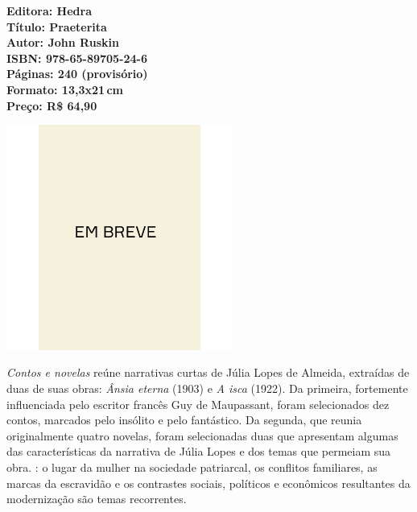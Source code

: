 \vfill
\noindent\begin{minipage}[c]{1\linewidth}
{\small\textbf{
\hspace*{-.1cm}Editora: Hedra\\
Título: Praeterita\\
Autor: John Ruskin\\ 
ISBN: 978-65-89705-24-6\\
Páginas: 240 (provisório)\\
Formato: 13,3x21\,cm\\
Preço: R\$ 64,90\\
}}
\end{minipage}
\pagebreak

\begin{center}
\hspace*{.5cm}\includegraphics[width=74mm]{./CAPAS/breve.jpeg}
\end{center}
\hspace*{-7cm}\hrulefill\hspace*{-7cm}
\medskip

\noindent{}\textit{Contos e novelas} reúne narrativas curtas de Júlia Lopes de Almeida, extraídas de duas de suas obras: \textit{Ânsia eterna} (1903) e \textit{A isca} (1922). Da primeira, fortemente influenciada pelo escritor francês Guy de Maupassant, foram selecionados dez contos, marcados pelo insólito e pelo fantástico. Da segunda, que reunia originalmente quatro novelas, foram selecionadas duas que apresentam algumas das características da narrativa de Júlia Lopes e dos temas que permeiam sua obra. : o lugar da mulher na sociedade patriarcal, os conflitos familiares, as marcas da escravidão e os contrastes sociais, políticos e econômicos resultantes da modernização são temas recorrentes.

